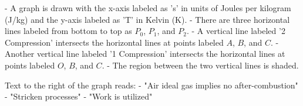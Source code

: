 - A graph is drawn with the x-axis labeled as 's' in units of Joules per kilogram (J/kg) and the y-axis labeled as 'T' in Kelvin (K).
- There are three horizontal lines labeled from bottom to top as \(P_0\), \(P_1\), and \(P_2\).
- A vertical line labeled '2 Compression' intersects the horizontal lines at points labeled \(A\), \(B\), and \(C\).
- Another vertical line labeled '1 Compression' intersects the horizontal lines at points labeled \(O\), \(B\), and \(C\).
- The region between the two vertical lines is shaded.

Text to the right of the graph reads:
- "Air ideal gas implies no after-combustion"
- "Stricken processes"
- "Work is utilized"